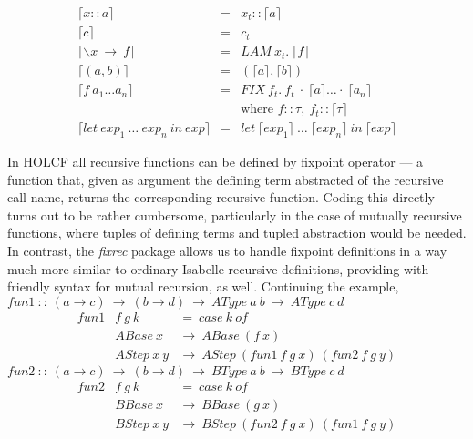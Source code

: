 \documentclass[a4paper,12pt]{article}
\begin{document}
$$\begin{array}{lcl} 
  \lceil x::a \rceil & = & x_{t}::\lceil a \rceil \\
  \lceil c \rceil & = & c_{t} \\
  \lceil \backslash x \ \to \ f \rceil & = & LAM \ x_{t}. \ \lceil f \rceil \\
  \lceil (a,b) \rceil & = & (\lceil a \rceil, \lceil b \rceil) \\
  \lceil f \ a_{1} \ldots a_{n} \rceil & = & FIX \ f_{t}. \ f_{t} \ \cdot \ 
  \lceil a \rceil \ldots \cdot \ \lceil a_{n} \rceil \\
  & & \mbox{where } f::\tau, \ f_{t}::\lceil \tau \rceil \\
  \lceil let \ exp_{1} \ \dots \ exp_{n} \ in \ exp \rceil & = 
         & let \ \lceil exp_{1} \rceil \ \dots \ \lceil exp_{n} \rceil \ in \ \lceil exp \rceil 
\end{array}$$

\noindent In HOLCF all recursive functions can be defined by fixpoint
operator --- a function that, given as argument the defining term
abstracted of the recursive call name, returns the corresponding
recursive function.  Coding this directly turns out to be rather
cumbersome, particularly in the case of mutually recursive functions,
where tuples of defining terms and tupled abstraction would be needed.
In contrast, the \emph{fixrec} package allows us to handle fixpoint
definitions in a way much more similar to ordinary Isabelle recursive
definitions, providing with friendly syntax for mutual recursion,
as well. Continuing the example,\\

\noindent $ fun1 \ :: \ (a \to c) \ \to \ (b \to d) \
\to \ AType \ a \ b \ \to \ AType \ c \ d $ 
$$\begin{array}{lll}
  fun1 & f \ g \ k  & = \ case \ k \ of \\
  & ABase \ x & \to \ ABase \ (f \ x) \\
  & AStep \ x \ y & \to \ AStep \ (fun1 \ f \ g \ x) \ (fun2 \ f \ g \
  y)
\end{array} $$
$ fun2 \ :: \ (a \to c) \ \to \ (b \to d) \ \to \ BType \ a \ b \ \to \ BType \ c \ d $
$$\begin{array}{lll}
  fun2 & f \ g \ k & = \ case \ k \ of \\
  & BBase \ x & \to \ BBase \ (g \ x) \\
  & BStep \ x \ y & \to \ BStep \ (fun2 \ f \ g \ x) \ (fun1 \ f \ g \ y)
\end{array} $$ 
\end{document}
